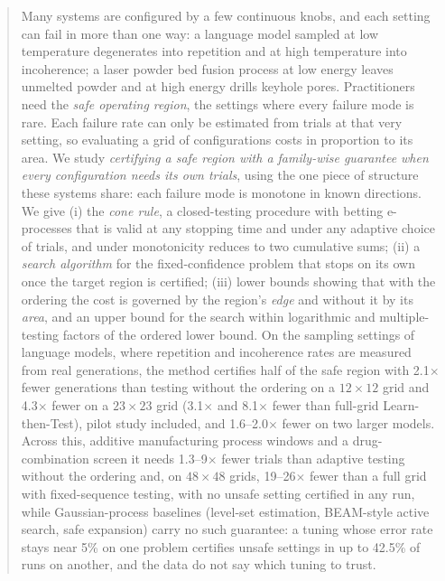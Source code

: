 \documentclass{article}
\newif\ificmlstyle
\begin{document}
\ificmlstyle
\twocolumn[
\icmltitle{Certifying Safe Operating Regions under Monotone Failure Modes}
\begin{icmlauthorlist}\icmlauthor{Anonymous}{anon}\end{icmlauthorlist}
\icmlaffiliation{anon}{Anonymous institution}
\icmlcorrespondingauthor{Anonymous}{anon@example.com}
\vskip 0.3in]
\printAffiliationsAndNotice{}
\else
{}
\fi

\begin{abstract}
Many systems are configured by a few continuous knobs, and each setting can
fail in more than one way: a language model sampled at low temperature
degenerates into repetition and at high temperature into incoherence; a
laser powder bed fusion process at low energy leaves unmelted powder and at
high energy drills keyhole pores. Practitioners need the \emph{safe
operating region}, the settings where every failure mode is rare. Each
failure rate can only be estimated from trials at that very setting, so
evaluating a grid of configurations costs in proportion to its area. We
study \emph{certifying a safe region with a family-wise guarantee when every
configuration needs its own trials}, using the one piece of structure these
systems share: each failure mode is monotone in known directions. We give
(i) the \emph{cone rule}, a closed-testing procedure with betting
e-processes that is valid at any stopping time and under any adaptive
choice of trials, and under monotonicity reduces to two cumulative sums;
(ii) a \emph{search algorithm} for the fixed-confidence problem that stops
on its own once the target region is certified; (iii) lower bounds showing
that with the ordering the cost is governed by the region's \emph{edge} and
without it by its \emph{area}, and an upper bound for the search within
logarithmic and multiple-testing factors of the ordered lower bound. On
the sampling settings of language models, where repetition and
incoherence rates are measured from real generations, the method
certifies half of the safe region with 2.1$\times$ fewer generations than
testing without the ordering on a $12\times12$ grid and 4.3$\times$ fewer
on a $23\times23$ grid (3.1$\times$ and 8.1$\times$ fewer than full-grid
Learn-then-Test), pilot study included, and 1.6--2.0$\times$ fewer on
two larger models. Across this, additive
manufacturing process windows and a drug-combination screen it needs
1.3--9$\times$ fewer trials than adaptive testing without the ordering
and, on $48\times48$ grids, 19--26$\times$ fewer than a full grid with
fixed-sequence testing, with no unsafe setting certified in any run,
while Gaussian-process baselines (level-set estimation, BEAM-style active
search, safe expansion) carry no such guarantee: a tuning whose error rate
stays near 5\% on one problem certifies unsafe settings in up to 42.5\%
of runs on another, and the data do not say which tuning to trust.
\end{abstract}
\end{document}
